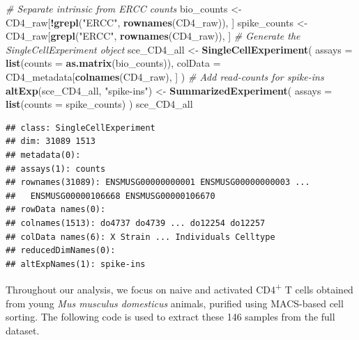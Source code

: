 \documentclass[9pt,a4paper,]{extarticle}
\newenvironment{Shaded}{\begin{snugshade}}{\end{snugshade}}
\newcommand{\CommentTok}[1]{\textcolor[rgb]{0.56,0.35,0.01}{\textit{#1}}}
\newcommand{\DataTypeTok}[1]{\textcolor[rgb]{0.13,0.29,0.53}{#1}}
\newcommand{\KeywordTok}[1]{\textcolor[rgb]{0.13,0.29,0.53}{\textbf{#1}}}
\newcommand{\NormalTok}[1]{#1}
\newcommand{\OperatorTok}[1]{\textcolor[rgb]{0.81,0.36,0.00}{\textbf{#1}}}
\newcommand{\StringTok}[1]{\textcolor[rgb]{0.31,0.60,0.02}{#1}}
\begin{document}
\begin{Shaded}
\begin{Highlighting}[]
\CommentTok{# Separate intrinsic from ERCC counts}
\NormalTok{bio_counts <-}\StringTok{ }\NormalTok{CD4_raw[}\OperatorTok{!}\KeywordTok{grepl}\NormalTok{(}\StringTok{"ERCC"}\NormalTok{, }\KeywordTok{rownames}\NormalTok{(CD4_raw)), ]}
\NormalTok{spike_counts <-}\StringTok{ }\NormalTok{CD4_raw[}\KeywordTok{grepl}\NormalTok{(}\StringTok{"ERCC"}\NormalTok{, }\KeywordTok{rownames}\NormalTok{(CD4_raw)), ]}
\CommentTok{# Generate the SingleCellExperiment object}
\NormalTok{sce_CD4_all <-}\StringTok{ }\KeywordTok{SingleCellExperiment}\NormalTok{(}
  \DataTypeTok{assays =} \KeywordTok{list}\NormalTok{(}\DataTypeTok{counts =} \KeywordTok{as.matrix}\NormalTok{(bio_counts)),}
  \DataTypeTok{colData =}\NormalTok{ CD4_metadata[}\KeywordTok{colnames}\NormalTok{(CD4_raw), ]}
\NormalTok{)}
\CommentTok{# Add read-counts for spike-ins }
\KeywordTok{altExp}\NormalTok{(sce_CD4_all, }\StringTok{"spike-ins"}\NormalTok{) <-}\StringTok{ }\KeywordTok{SummarizedExperiment}\NormalTok{(}
  \DataTypeTok{assays =} \KeywordTok{list}\NormalTok{(}\DataTypeTok{counts =}\NormalTok{ spike_counts)}
\NormalTok{)}
\NormalTok{sce_CD4_all}
\end{Highlighting}
\end{Shaded}

\begin{verbatim}
## class: SingleCellExperiment 
## dim: 31089 1513 
## metadata(0):
## assays(1): counts
## rownames(31089): ENSMUSG00000000001 ENSMUSG00000000003 ...
##   ENSMUSG00000106668 ENSMUSG00000106670
## rowData names(0):
## colnames(1513): do4737 do4739 ... do12254 do12257
## colData names(6): X Strain ... Individuals Celltype
## reducedDimNames(0):
## altExpNames(1): spike-ins
\end{verbatim}

Throughout our analysis, we focus on naive and activated CD4\textsuperscript{+} T cells obtained
from young \emph{Mus musculus domesticus} animals, purified using MACS-based cell sorting.
The following code is used to extract these
146 samples from the full dataset.

\begin{Shaded}
\end{Shaded}
\end{document}

